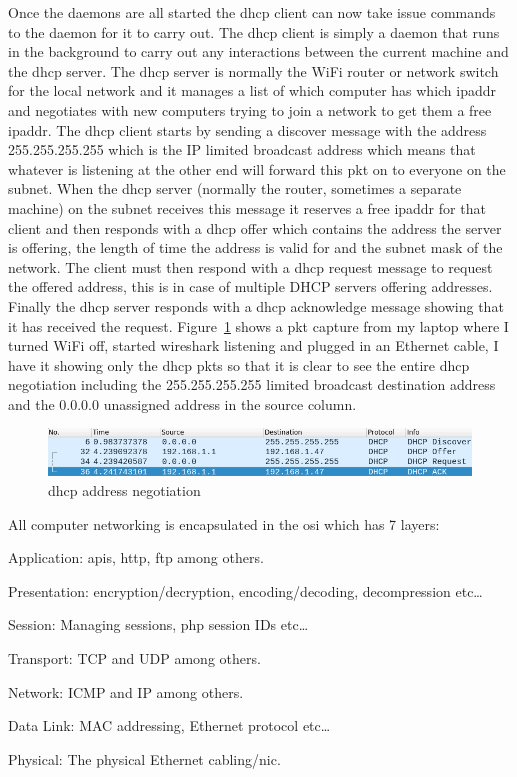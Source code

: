 \documentclass[titlepage]{article}
\begin{document}
Once the \glspl{daemon} are all started the \gls{dhcp} client can now take issue commands to the daemon
for it to carry out. The \gls{dhcp} client is simply a daemon that runs in the background to carry out any
interactions between the current machine and the \gls{dhcp} server. The \gls{dhcp} server is normally the
WiFi router or network switch for the local network and it manages a list of which computer has which
\gls{ipaddr} and negotiates with new computers trying to join a network to get them a free \gls{ipaddr}.
The \gls{dhcp} client starts by sending a discover message with the address 255.255.255.255 which
is the IP limited broadcast address which means that whatever is listening at the other end will forward
this \gls{pkt} on to everyone on the \gls{subnet}. When the \gls{dhcp} \gls{server} (normally the router,
sometimes a separate machine) on the subnet receives this message it reserves a free \gls{ipaddr} for that
client and then responds with a \gls{dhcp} offer which contains the address the \gls{server} is offering,
the length of time the address is valid for and the \gls{subnet} mask of the network. The client must then
respond with a \gls{dhcp} request message to request the offered address, this is in case of multiple DHCP
servers offering addresses. Finally the \gls{dhcp} server responds with a \gls{dhcp} acknowledge message
showing that it has received the request. Figure~\ref{dhcp_negotiate} shows a \gls{pkt} capture from my
laptop where I turned WiFi off, started wireshark listening and plugged in an Ethernet cable, I have it
showing only the \gls{dhcp} \glspl{pkt} so that it is clear to see the entire \gls{dhcp} negotiation
including the 255.255.255.255 limited broadcast destination address and the 0.0.0.0 unassigned address
in the source column.

\begin{figure}[H]
  \centering
  \includegraphics[width=\textwidth]{screenshots/dhcp_negotiation.png}
  \caption{\gls{dhcp} address negotiation}\label{dhcp_negotiate}
\end{figure}

All computer networking is encapsulated in the \gls{osi} which has 7 layers:

\begin{etaremune}
  \item{Application: \gls{api}s, \gls{http}, \gls{ftp} among others.}
  \item{Presentation: encryption/decryption, encoding/decoding, decompression etc\ldots}
  \item{Session: Managing sessions, \gls{php} session IDs etc\ldots}
  \item{Transport: TCP and UDP among others.}
  \item{Network: ICMP and IP among others.}
  \item{Data Link: MAC addressing, Ethernet protocol etc\ldots}
  \item{Physical: The physical Ethernet cabling/\gls{nic}.}
\end{etaremune}
\end{document}

